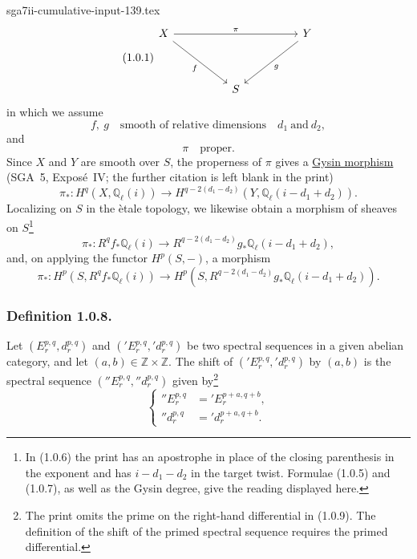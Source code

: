 \begin{filecontents*}{sga7ii-cumulative-input-139.tex}
\begin{equation}\tag{1.0.1}
\begin{tikzcd}[column sep=huge, row sep=huge]
X \arrow[rr, "\pi"] \arrow[dr, "f"'] & {} & Y \arrow[dl, "g"] \\
{} & S & {}
\end{tikzcd}
\end{equation}
in which we assume
\begin{equation}\tag{1.0.3}
f,\ g \quad\text{smooth of relative dimensions}\quad d_1\ \text{and}\ d_2,
\end{equation}
and
\begin{equation}\tag{1.0.4}
\pi\quad\text{proper}.
\end{equation}
Since $X$ and $Y$ are smooth over $S$, the properness of $\pi$ gives a
\underline{Gysin morphism} (SGA~5, Expos\'e~IV; the further citation is left
blank in the print)
\begin{equation}\tag{1.0.5}
\pi_*:H^q(X,\mathbb Q_\ell(i))\longrightarrow
H^{q-2(d_1-d_2)}(Y,\mathbb Q_\ell(i-d_1+d_2)).
\end{equation}
Localizing on $S$ in the \`etale topology, we likewise obtain a morphism of
sheaves on $S$\footnote{In (1.0.6) the print has an apostrophe in place of
the closing parenthesis in the exponent and has $i-d_1-d_2$ in the target
twist.  Formulae (1.0.5) and (1.0.7), as well as the Gysin degree, give the
reading displayed here.}
\begin{equation}\tag{1.0.6}
\pi_*:R^qf_*\mathbb Q_\ell(i)\longrightarrow
R^{q-2(d_1-d_2)}g_*\mathbb Q_\ell(i-d_1+d_2),
\end{equation}
and, on applying the functor $H^p(S,-)$, a morphism
\begin{equation}\tag{1.0.7}
\pi_*:H^p(S,R^qf_*\mathbb Q_\ell(i))\longrightarrow
H^p(S,R^{q-2(d_1-d_2)}g_*\mathbb Q_\ell(i-d_1+d_2)).
\end{equation}

\subsubsection*{Definition 1.0.8.}
Let $(E_r^{p,q},d_r^{p,q})$ and
$({}'E_r^{p,q},{}'d_r^{p,q})$ be two spectral sequences in a given abelian
category, and let $(a,b)\in\mathbb Z\times\mathbb Z$.  The shift of
$({}'E_r^{p,q},{}'d_r^{p,q})$ by $(a,b)$ is the spectral sequence
$({}''E_r^{p,q},{}''d_r^{p,q})$ given by\footnote{The print omits the prime
on the right-hand differential in (1.0.9).  The definition of the shift of
the primed spectral sequence requires the primed differential.}
\begin{equation}\tag{1.0.9}
\left\{
\begin{aligned}
{}''E_r^{p,q}&={}'E_r^{p+a,q+b},\\
{}''d_r^{p,q}&={}'d_r^{p+a,q+b}.
\end{aligned}
\right.
\end{equation}


\end{filecontents*}
